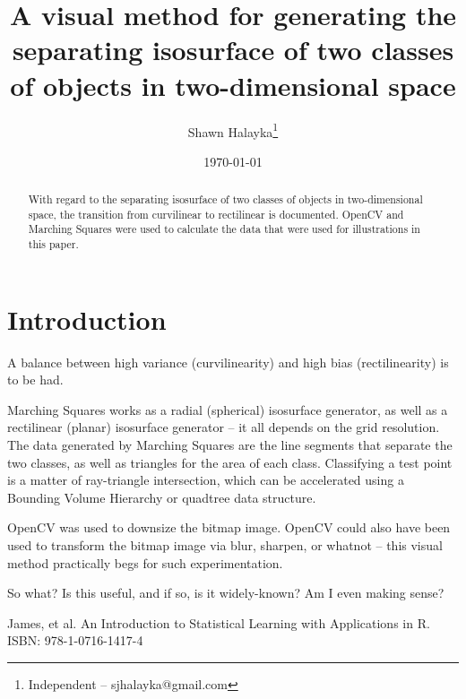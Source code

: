 \documentclass[12pt]{article}
\title{A visual method for generating the separating isosurface of two classes of objects in two-dimensional space}
\author{
Shawn Halayka\footnote{Independent -- sjhalayka@gmail.com}
}
\date{\today\;\currenttime}
\begin{document}
\maketitle

\begin{abstract}
With regard to the separating isosurface of two classes of objects in two-dimensional space, the transition from curvilinear to rectilinear is documented.
OpenCV and Marching Squares were used to calculate the data that were used for illustrations in this paper.
\end{abstract}




\section{Introduction}

A balance between high variance (curvilinearity) and high bias (rectilinearity) is to be had.

Marching Squares works as a radial (spherical) isosurface generator, as well as a rectilinear (planar) isosurface generator -- it all depends on the grid resolution.
The data generated by Marching Squares are the line segments that separate the two classes, as well as triangles for the area of each class.
Classifying a test point is a matter of ray-triangle intersection, which can be accelerated using a Bounding Volume Hierarchy or quadtree data structure.

OpenCV was used to downsize the bitmap image.
OpenCV could also have been used to transform the bitmap image via blur, sharpen, or whatnot -- this visual method practically begs for such experimentation.

So what? Is this useful, and if so, is it widely-known?
Am I even making sense?



\begin{thebibliography}{9}

 James, et al. An Introduction to Statistical Learning with Applications in R. ISBN: 978-1-0716-1417-4

\end{thebibliography}
\end{document}
